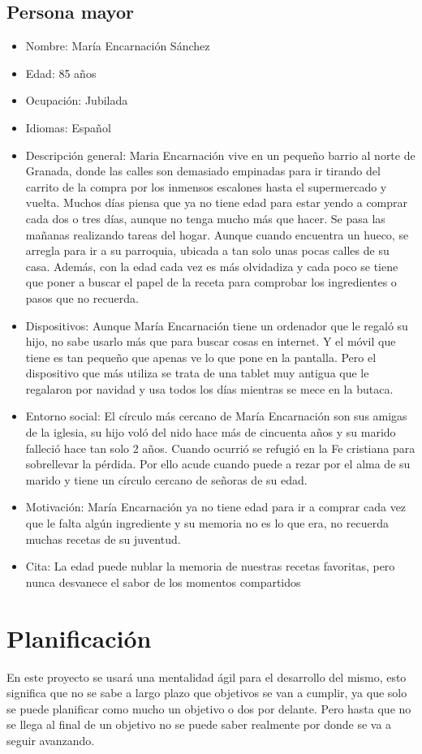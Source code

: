 \subsection{Persona mayor}
\begin{itemize}
    \item Nombre: María Encarnación Sánchez
    \item Edad: 85 años
    \item Ocupación: Jubilada
    \item Idiomas: Español
    \item Descripción general: Maria Encarnación vive en un pequeño barrio al norte de Granada, donde las calles son demasiado empinadas para ir tirando del carrito de la compra por los inmensos escalones hasta el supermercado y vuelta. Muchos días piensa que ya no tiene edad para estar yendo a comprar cada dos o tres días, aunque no tenga mucho más que hacer. Se pasa las mañanas realizando tareas del hogar. Aunque cuando encuentra un hueco, se arregla para ir a su parroquia, ubicada a tan solo unas pocas calles de su casa. Además, con la edad cada vez es más olvidadiza y cada poco se tiene que poner a buscar el papel de la receta para comprobar los ingredientes o pasos que no recuerda.
    \item Dispositivos: Aunque María Encarnación tiene un ordenador que le regaló su hijo, no sabe usarlo más que para buscar cosas en internet. Y el móvil que tiene es tan pequeño que apenas ve lo que pone en la pantalla. Pero el dispositivo que más utiliza se trata de una tablet muy antigua que le regalaron por navidad y usa todos los días mientras se mece en la butaca.
    \item Entorno social: El círculo más cercano de María Encarnación son sus amigas de la iglesia, su hijo voló del nido hace más de cincuenta años y su marido falleció hace tan solo 2 años. Cuando ocurrió se refugió en la Fe cristiana para sobrellevar la pérdida. Por ello acude cuando puede a rezar por el alma de su marido y tiene un círculo cercano de señoras de su edad. 
    \item Motivación: María Encarnación ya no tiene edad para ir a comprar cada vez que le falta algún ingrediente y su memoria no es lo que era, no recuerda muchas recetas de su juventud.
    \item Cita: La edad puede nublar la memoria de nuestras recetas favoritas, pero nunca desvanece el sabor de los momentos compartidos
\end{itemize}

\section{Planificación}
En este proyecto se usará una mentalidad ágil para el desarrollo del mismo, esto significa que no se sabe a largo plazo que objetivos se van a cumplir, ya que solo se puede planificar como mucho un objetivo o dos por delante. Pero hasta que no se llega al final de un objetivo no se puede saber realmente por donde se va a seguir avanzando.

